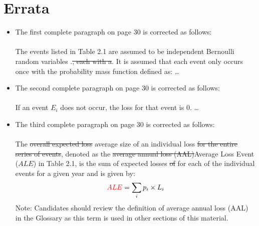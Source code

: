 \documentclass[]{article}
\begin{document}
\section{Errata}
\begin{itemize}
\item The first complete paragraph on page 30 is corrected as follows:\\
\\
The events listed in Table 2.1 are assumed to be independent Bernoulli random variables \color{red} .\sout{, each with a}.  It is assumed that each event only occurs once with \color{red} the \color{black} probability mass function defined as: \ldots   

\item The second complete paragraph on page 30 is corrected as follows:\\
\\
If an event $E_i$ does not occur, the loss \color{red} for that event \color{black} is 0. \ldots 

\item The third complete paragraph on page 30 is corrected as follows:\\
\\
The \color{red} \sout{overall expected loss} average size of an individual loss \sout{for the entire series of events}\color{black}, denoted as the \color{red} \sout{average annual loss (AAL)}Average Loss Event ($ALE$) \color{black} in Table 2.1, is the sum of expected losses \color{red} \sout{of} for \color{black} each of the individual events for a given year and is given by:\\
\begin{equation*}
 \color{red}ALE \color{black} = \sum_i p_i \times L_i  \\
\end{equation*}
\color{red} Note: Candidates should review the definition of average annual loss (AAL) in the Glossary as this term is used in other sections of this material.
\color{black}


\end{itemize}
\end{document}
